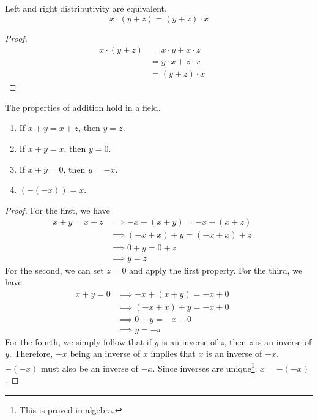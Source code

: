 \documentclass{article}
\begin{document}
      \begin{lemma}[Left = Right Distributivity]
        Left and right distributivity are equivalent. 
        \begin{equation}
          x \cdot (y + z) = (y + z) \cdot x
        \end{equation}
      \end{lemma} 
      \begin{proof}
        \begin{align}
          x \cdot (y + z) & = x \cdot y + x \cdot z && \tag{Distributive} \\
                          & = y \cdot x + z \cdot x && \tag{Commutative} \\
                          & = (y + z) \cdot x && \tag{Distributive} 
        \end{align}
      \end{proof} 

      \begin{lemma}
        The properties of addition hold in a field. 
        \begin{enumerate}
          \item If $x + y = x + z$, then $y = z$. 
          \item If $x + y = x$, then $y = 0$. 
          \item If $x + y = 0$, then $y = -x$. 
          \item $(-(-x)) = x$. 
        \end{enumerate}
      \end{lemma}
      \begin{proof}
        For the first, we have 
        \begin{align}
          x + y = x + z & \implies -x + (x + y) = -x + (x + z) && \tag{addition is a function} \\
                        & \implies (-x + x) + y = (-x + x) + z && \tag{$+$ is associative} \\
                        & \implies 0 + y = 0 + z && \tag{definition of additive inverse} \\
                        & \implies y = z && \tag{definition of identity}
        \end{align} 
        For the second, we can set $z = 0$ and apply the first property. For the third, we have 
        \begin{align}
          x + y = 0 & \implies -x + (x + y) = -x + 0 && \tag{addition is a function} \\
                    & \implies (-x + x) + y = -x + 0 && \tag{$+$ is associative} \\
                    & \implies 0 + y = -x + 0 && \tag{definition of additive inverse} \\
                    & \implies y = -x && \tag{definition of identity}
        \end{align}
        For the fourth, we simply follow that if $y$ is an inverse of $z$, then $z$ is an inverse of $y$. Therefore, $-x$ being an inverse of $x$ implies that $x$ is an inverse of $-x$. $-(-x)$ must also be an inverse of $-x$. Since inverses are unique\footnote{This is proved in algebra.}, $x = -(-x)$. 
      \end{proof}
\end{document}
